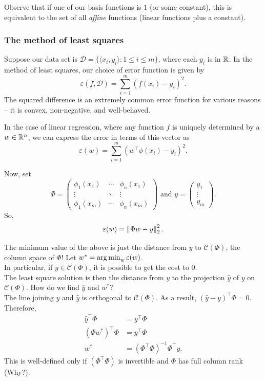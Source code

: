 \documentclass{article}
\begin{document}
		Observe that if one of our basis functions is $1$ (or some constant), this is equivalent to the set of all \emph{affine} functions (linear functions plus a constant).


		\subsubsection{The method of least squares}

			Suppose our data set is $\mathcal{D} = \{\langle x_i,y_i\rangle : 1 \le i \le m\}$, where each $y_i$ is in $\mathbb{R}$. In the method of least squares, our choice of error function is given by
			\[ \varepsilon(f,\mathcal{D}) = \sum_{i=1}^m (f(x_i) - y_i)^2. \]
			The squared difference is an extremely common error function for various reasons -- it is convex, non-negative, and well-behaved.

			In the case of linear regression, where any function $f$ is uniquely determined by a $w\in \mathbb{R}^n$, we can express the error in terms of this vector as
			\[ \varepsilon(w) = \sum_{i=1}^m (w^\top \phi(x_i) - y_i)^2. \]

			Now, set
			\[
				\Phi =
				\begin{pmatrix}
					\phi_1(x_1) & \cdots & \phi_n(x_1) \\
					\vdots & \ddots & \vdots \\
					\phi_1(x_m) & \cdots & \phi_n(x_m)
				\end{pmatrix}
				\text{ and }
				y =
				\begin{pmatrix}
					y_1 \\
					\vdots \\
					y_m
				\end{pmatrix}.
			\]
			So,
			\[ \varepsilon(w) = \left\lVert\Phi w - y\right\rVert_2^2. \]

			The minimum value of the above is just the distance from $y$ to $\mathcal{C}(\Phi)$, the column space of $\Phi$! Let $w^* = \operatorname*{arg\,min}_{w} \varepsilon(w)$.\\
			In particular, if $y\in\mathcal{C}(\Phi)$, it is possible to get the cost to $0$.\\
			The least square solution is then the distance from $y$ to the projection $\hat{y}$ of $y$ on $\mathcal{C}(\Phi)$. How do we find $\hat{y}$ and $w^*$?\\
			The line joining $y$ and $\hat{y}$ is orthogonal to $\mathcal{C}(\Phi)$. As a result, $(\hat{y} - y)^\top \Phi = 0$. Therefore,
			\begin{align*}
				\hat{y}^\top \Phi &= y^\top \Phi \\
				(\Phi w^*)^\top \Phi &= y^\top \Phi \\
				w^* &= (\Phi^\top \Phi)^{-1} \Phi^\top y.
			\end{align*}
			This is well-defined only if $(\Phi^\top \Phi)$ is invertible and $\Phi$ has full column rank (Why?).
\end{document}
